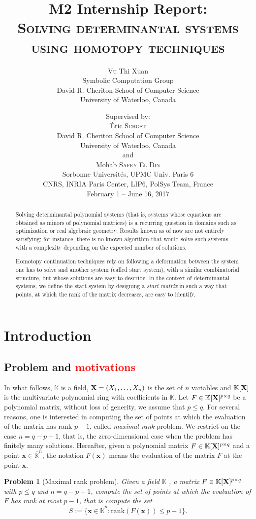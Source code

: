 \documentclass[11pt]{article}
\title{M2 Internship Report: \\
\textsc{Solving determinantal systems using homotopy techniques}}
\author{\textsc{Vu} Thi Xuan\\
Symbolic Computation Group \\
David R. Cheriton School of Computer Science\\ University of Waterloo, Canada}
\date{
Supervised by:\\
\vspace*{0.3cm}
Éric \textsc{Schost}\\
David R. Cheriton School of Computer Science\\ University of Waterloo, Canada\\
\vspace*{0.3cm}
and \\
\vspace*{0.3cm}
Mohab \textsc{Safey El Din}\\ 
Sorbonne Universités, UPMC Univ. Paris 6\\
CNRS, INRIA Paris Center, LIP6, PolSys Team, France\\
\vspace*{1cm}
February 1 -- June 16, 2017
}
\newtheorem{pbm}{Problem}
\numberwithin{Property}{section}
\numberwithin{Theorem}{section}
\numberwithin{Proposition}{section}
\numberwithin{Lemma}{section}
\numberwithin{Corollary}{section}
\numberwithin{Definition}{section}
\numberwithin{Remark}{section}
\numberwithin{Conjecture}{section}
\numberwithin{Problem}{section}
\numberwithin{Claim}{section}
\theoremstyle{definition}
\numberwithin{Example}{section}
\renewcommand{\leq}{\leqslant}
\def\bar{\overline}
\newcommand{\field}{\mathbb{K}} %
\newcommand{\mat}[1]{\mathbf{\MakeUppercase{#1}}} %
\newcommand{\todo}[1]{\textcolor{red}{#1}} %
\begin{document}
\maketitle
\begin{abstract}
Solving determinantal polynomial systems (that is, systems whose equations are obtained as minors of polynomial matrices) is a recurring question in domains such as optimization or real algebraic geometry. Results known as of now are not entirely satisfying; for instance, there is no known algorithm that would solve such systems with a complexity depending on the expected number of solutions. 

Homotopy continuation techniques rely on following a deformation between the system one has to solve and another system (called start system), with a similar combinatorial structure, but whose solutions are easy to describe. In the context of determinantal systems, we define the start system by designing a \emph{start matrix} in such a way that points, at which the rank of the matrix decreases, are easy to identify. 
\end{abstract}
\newpage
\section{Introduction}
\label{sec:intro}
\subsection{Problem and \todo{motivations}} In what follows, $\field$ is a field, $\mat{X} = (X_1, \ldots, X_n)$ is the set of $n$ variables and $\field[\mat{X}]$ is the multivariate polynomial ring with coefficients in $\field$. Let $F \in \field[\mat{X}]^{p \times q}$ be a polynomial matrix, without loss of generity, we assume that $p \leq q$. For several reasons, one is interested in computing the set of points at which the evaluation of the matrix has rank $p-1$, called \emph{maximal rank} problem. We restrict on the case $n = q-p+1$, that is, the zero-dimensional case when the problem has finitely many solutions. Hereafter, given a polynomial matrix $F \in \field[\mat{X}]^{p \times q}$ and a point $\mathbf{x} \in \bar{\field}^n$, the notation $F({\mathbf{x}})$ means the evaluation of the matrix $F$ at the point $\mathbf{x}$. 

\begin{pbm}[Maximal rank problem] \label{problem} Given a field $\field$ , a matrix $F \in \field[\mat{X}]^{p \times q}$ with $p \leq q$ and $n = q-p+1$, compute the set of points at which the evaluation of $F$ has rank at most $p-1$, that is compute the set
\[S := \{\mathbf{x} \in \bar{\field}^n : \mathrm{rank}(F({\mathbf{x}})) \leq p - 1 \}.\]
\end{pbm}
\end{document}
